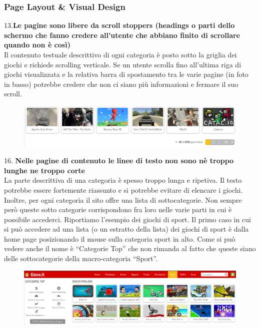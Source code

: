 \documentclass[../Report.tex]{subfiles}
\begin{document}
    \subsubsection{Page Layout \& Visual Design}
    13.\textbf{Le pagine sono libere da scroll stoppers (headings o parti dello schermo che fanno credere all’utente che abbiano finito di scrollare quando non è così)}\\
    Il contenuto testuale descrittivo di ogni categoria è posto sotto la griglia dei giochi e richiede scrolling verticale. Se un utente scrolla fino all’ultima riga di giochi visualizzata e la relativa barra di spostamento tra le varie pagine (in foto in basso) potrebbe credere che non ci siano più informazioni e fermare il suo scroll.

    \begin{figure}[H]
        \includegraphics[width=\linewidth]{Assestment9.png}
        \centering
    \end{figure}

    16.\textbf{ Nelle pagine di contenuto le linee di testo non sono nè troppo lunghe ne troppo corte}\\
    La parte descrittiva di una categoria è spesso troppo lunga e ripetiva. Il testo potrebbe essere fortemente riassunto e si potrebbe evitare di elencare i giochi. \\

    Inoltre, per ogni categoria il sito offre una lista di sottocategorie. Non sempre però queste sotto categorie corrispondono fra loro nelle varie parti in cui è possibile accederci. Riportiamo l’esempio dei giochi di sport. 
    Il primo caso in cui si può accedere ad una lista (o un estratto della lista) dei giochi di sport è dalla home page posizionando il mouse sulla categoria sport in alto. Come si può vedere anche il nome è “Categorie Top” che non rimanda al fatto che queste siano delle sottocategorie della macro-categoria “Sport”. 
    
    \begin{figure}[H]
        \includegraphics[width=\linewidth]{Assestment10.png}
        \centering
    \end{figure}
\end{document}
